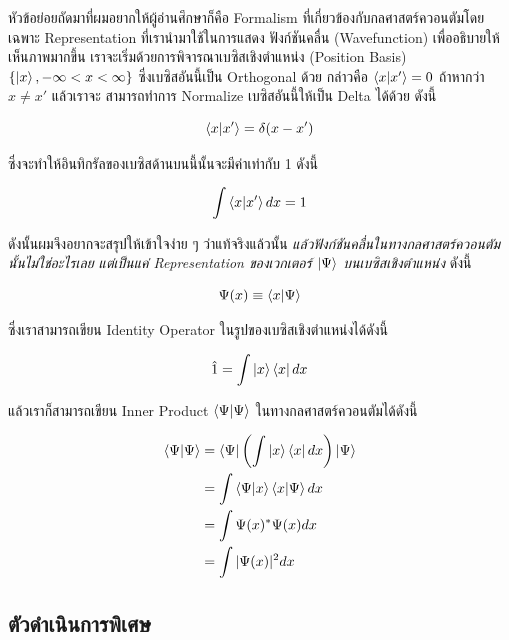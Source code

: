 หัวข้อย่อยถัดมาที่ผมอยากให้ผู้อ่านศึกษาก็คือ Formalism ที่เกี่ยวข้องกับกลศาสตร์ควอนตัมโดยเฉพาะ Representation ที่เรานำมาใช้ในการแสดง%
ฟังก์ชันคลื่น (Wavefunction) เพื่ออธิบายให้เห็นภาพมากขึ้น เราจะเริ่มด้วยการพิจารณาเบซิสเชิงตำแหน่ง (Position Basis) $\{ \ket{x},
  -\infty < x < \infty \}$ ซึ่งเบซิสอันนี้เป็น Orthogonal ด้วย กล่าวคือ $\braket{x}{x'} = 0$ ถ้าหากว่า $x \neq x'$ แล้วเราจะ%
สามารถทำการ Normalize เบซิสอันนี้ให้เป็น Delta ได้ด้วย ดังนี้

\begin{equation}
  \braket{x}{x'}
  =
  \delta(x - x')
\end{equation}

\noindent ซึ่งจะทำให้อินทิกรัลของเบซิสด้านบนนี้นั้นจะมีค่าเท่ากับ 1 ดังนี้

\begin{equation}
  \int \braket{x}{x'} dx
  =
  1
\end{equation}

ดังนั้นผมจึงอยากจะสรุปให้เข้าใจง่าย ๆ ว่าแท้จริงแล้วนั้น \textit{แล้วฟังก์ชันคลื่นในทางกลศาสตร์ควอนตัมนั้นไม่ใช่อะไรเลย แต่เป็นแค่
  Representation ของเวกเตอร์ $\ket{\Psi}$ บนเบซิสเชิงตำแหน่ง} ดังนี้

\begin{equation}
  \Psi(x) \equiv \braket{x}{\Psi}
\end{equation}

\noindent ซึ่งเราสามารถเขียน Identity Operator ในรูปของเบซิสเชิงตำแหน่งได้ดังนี้

\begin{equation}
  \hat{1}
  =
  \int \ket{x} \bra{x} dx
\end{equation}

\noindent แล้วเราก็สามารถเขียน Inner Product $\braket{\Psi}$ ในทางกลศาสตร์ควอนตัมได้ดังนี้

\begin{align}
  \braket{\Psi}
   & =
  \bra{\Psi} \left( \int \ket{x} \bra{x} dx \right) \ket{\Psi} \\
   & =
  \int \braket{\Psi}{x} \braket{x}{\Psi} dx                    \\
   & =
  \int \Psi(x)^* \Psi(x) dx                                    \\
   & =
  \int |\Psi(x)|^2 dx
\end{align}

\subsection{ตัวดำเนินการพิเศษ}


